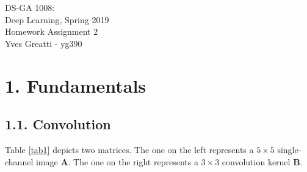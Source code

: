 \documentclass[11pt]{article}
\newcommand{\0}{\mat{0}}
\newcommand{\matr}[1]{\bm{#1}}     %
\begin{document}
\noindent DS-GA 1008:\\
Deep Learning, Spring 2019\\
Homework Assignment 2 \\
Yves Greatti - yg390\\

\section*{1. Fundamentals}
\subsection*{1.1. Convolution}
Table \ref{tab1} depicts two matrices. The one on the left represents a $5\times 5$ single-channel image $\matr{A}$. The one on the right
 represents a $3\times 3$ convolution kernel $\matr{B}$. 
\end{document}
